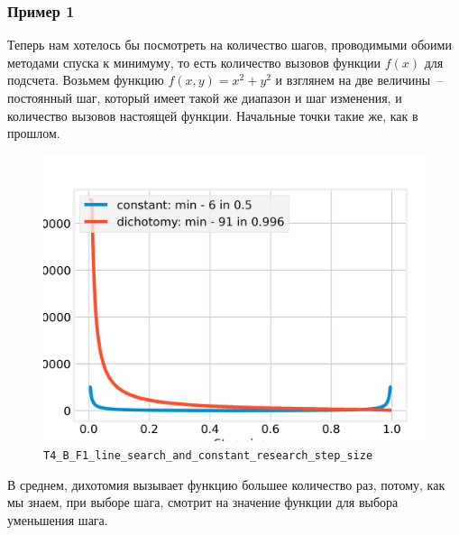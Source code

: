 \documentclass[12pt, a4paper, oneside, final]{article}
\begin{document}
	\subsubsection*{Пример 1}
	Теперь нам хотелось бы посмотреть на количество шагов, проводимыми обоими методами спуска к минимуму, то есть количество вызовов функции $f(x)$ для подсчета. Возьмем функцию $f(x, y) = x^{2} + y^{2}$ и взглянем на две величины~-- постоянный шаг, который имеет такой же диапазон и шаг изменения, и количество вызовов настоящей функции. Начальные точки такие же, как в прошлом.
	\begin{figure}[H]
		\centering
		\includegraphics[scale=0.68]{Image/T4_B_F1_line_search_and_constant_research_step_size.png}
		\caption*{\texttt{T4\_B\_F1\_line\_search\_and\_constant\_research\_step\_size}}
	\end{figure}
	В среднем, дихотомия вызывает функцию большее количество раз, потому, как мы знаем, при выборе шага, смотрит на значение функции для выбора уменьшения шага.
\end{document}
